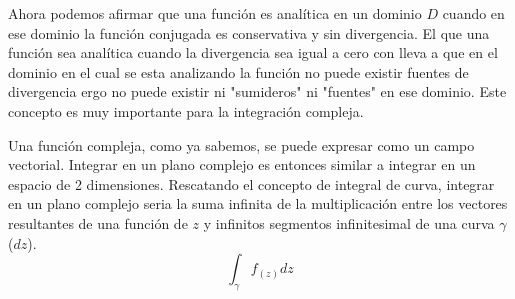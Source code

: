 Ahora podemos afirmar que una función es analítica en un dominio $D$ cuando en ese dominio la función conjugada es conservativa y sin divergencia. El que una función sea analítica cuando la divergencia sea igual a cero con lleva a que en el dominio en el cual se esta analizando la función no puede existir fuentes de divergencia ergo no puede existir ni "sumideros" ni "fuentes" en ese dominio. Este concepto es muy importante para la integración compleja.

Una función compleja, como ya sabemos, se puede expresar como un campo vectorial. Integrar en un plano complejo es entonces similar a integrar en un espacio de 2 dimensiones. Rescatando el concepto de integral de curva, integrar en un plano complejo seria la suma infinita de la multiplicación entre los vectores resultantes de una función de $z$ y infinitos segmentos infinitesimal de una curva $\gamma$ ($dz$).
\begin{equation}
    \int_\gamma f_{(z)} dz
\end{equation}
\begin{figure}[H]
    \centering
    
    \label{fig:enter-label}
\end{figure}

